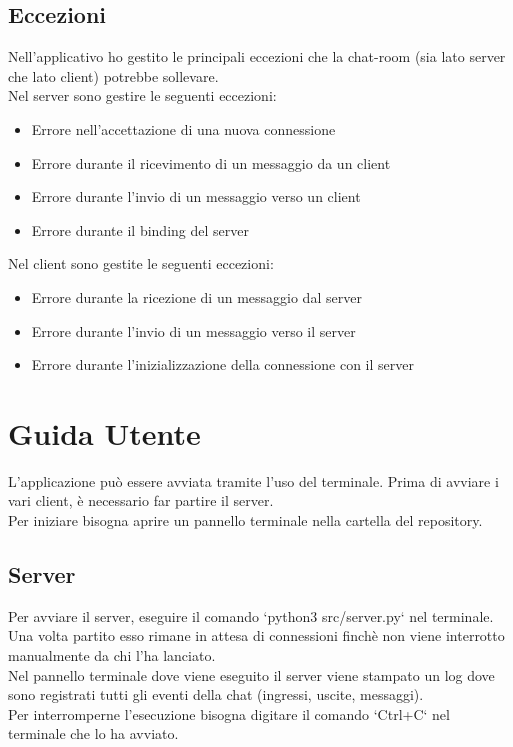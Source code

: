 \documentclass{article}
\begin{document}
\subsection{Eccezioni}
Nell'applicativo ho gestito le principali eccezioni che la chat-room (sia lato server che lato client) potrebbe sollevare.\\
Nel server sono gestire le seguenti eccezioni:
\begin{itemize}
    \item Errore nell'accettazione di una nuova connessione
    \item Errore durante il ricevimento di un messaggio da un client
    \item Errore durante l'invio di un messaggio verso un client
    \item Errore durante il binding del server
\end{itemize}
Nel client sono gestite le seguenti eccezioni:
\begin{itemize}
    \item Errore durante la ricezione di un messaggio dal server
    \item Errore durante l'invio di un messaggio verso il server
    \item Errore durante l'inizializzazione della connessione con il server
\end{itemize}

\newpage

\section{Guida Utente}
L'applicazione può essere avviata tramite l'uso del terminale. Prima di avviare i vari client, è necessario far partire il server.\\
Per iniziare bisogna aprire un pannello terminale nella cartella del repository.
\subsection{Server}
Per avviare il server, eseguire il comando `python3 src/server.py` nel terminale. Una volta partito esso rimane in attesa di connessioni finchè non viene interrotto manualmente da chi l'ha lanciato.\\
Nel pannello terminale dove viene eseguito il server viene stampato un log dove sono registrati tutti gli eventi della chat (ingressi, uscite, messaggi).\\
Per interromperne l'esecuzione bisogna digitare il comando `Ctrl+C` nel terminale che lo ha avviato.\\
\end{document}
